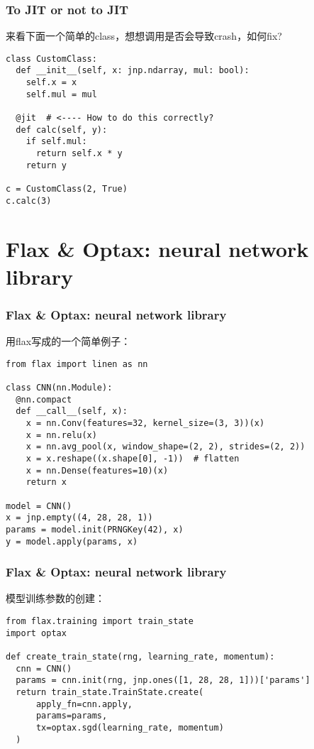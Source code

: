 \documentclass{beamer}
\begin{document}
\begin{frame}[fragile]
\frametitle{To JIT or not to JIT}

来看下面一个简单的class，想想调用是否会导致crash，如何fix?
\begin{examples}
\begin{verbatim}
class CustomClass:
  def __init__(self, x: jnp.ndarray, mul: bool):
    self.x = x
    self.mul = mul

  @jit  # <---- How to do this correctly?
  def calc(self, y):
    if self.mul:
      return self.x * y
    return y

c = CustomClass(2, True)
c.calc(3) 
\end{verbatim}
\end{examples}

\end{frame}



\section{Flax \& Optax: neural network library}

\begin{frame}[fragile]
\frametitle{Flax \& Optax: neural network library}
用flax写成的一个简单例子：
\begin{verbatim}
from flax import linen as nn 

class CNN(nn.Module):
  @nn.compact
  def __call__(self, x):
    x = nn.Conv(features=32, kernel_size=(3, 3))(x)
    x = nn.relu(x)
    x = nn.avg_pool(x, window_shape=(2, 2), strides=(2, 2))
    x = x.reshape((x.shape[0], -1))  # flatten
    x = nn.Dense(features=10)(x)
    return x

model = CNN()
x = jnp.empty((4, 28, 28, 1))
params = model.init(PRNGKey(42), x)
y = model.apply(params, x)

\end{verbatim}
\end{frame}

\begin{frame}[fragile]
\frametitle{Flax \& Optax: neural network library}
模型训练参数的创建：
\begin{verbatim}
from flax.training import train_state
import optax

def create_train_state(rng, learning_rate, momentum):
  cnn = CNN()
  params = cnn.init(rng, jnp.ones([1, 28, 28, 1]))['params']
  return train_state.TrainState.create(
      apply_fn=cnn.apply,
      params=params,
      tx=optax.sgd(learning_rate, momentum)
  )
\end{verbatim}
\end{frame}
\end{document}
